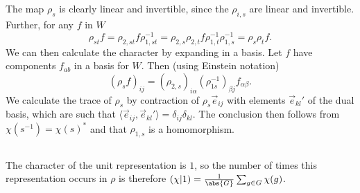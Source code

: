 \documentclass[a4paper, oneside, 10pt]{article}
\numberwithin{Answer}{section}
\numberwithin{Exercise}{section}
\begin{document}
\subsection{}
The map $\rho_s$ is clearly linear and invertible, since the $\rho_{i, s}$ are linear and invertible.
Further, for any $f$ in $W$
\[
    \rho_{st}f = \rho_{2, st} f \rho_{1, st}^{-1} = \rho_{2, s} \rho_{2, t} f \rho_{1, t}^{-1} \rho_{1, s}^{-1} = \rho_{s} \rho_t f. 
\]
We can then calculate the character by expanding in a basis.
Let $f$ have components $f_{ab}$ in a basis for $W$.
Then (using Einstein notation)
\[
    (\rho_s f)_{ij} = (\rho_{2, s})_{i\alpha}(\rho_{1s}^{-1})_{\beta j} f_{\alpha \beta}.
\]
We calculate the trace of $\rho_s$ by contraction of $\rho_s \vec{e}_{ij}$ with elements
$\vec{e}_{kl}'$ of the dual basis, which are such that $\langle \vec{e}_{ij}, \vec{e}_{kl}'\rangle = \delta_{ij}\delta_{kl}$.
The conclusion then follows from $\chi(s^{-1}) = \chi(s)^*$ and that $\rho_{1, s}$ is a homomorphism.

\subsection{}
The character of the unit representation is $1$, so the number of times this representation
occurs in $\rho$ is therefore $(\chi | 1)= \frac{1}{\abs{G}} \sum_{g\in G} \chi(g)$.
\end{document}
